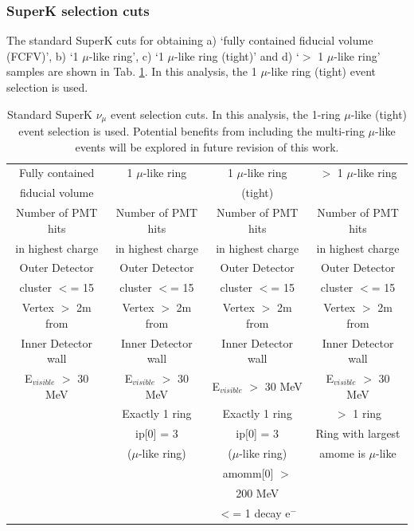 \subsubsection*{SuperK selection cuts}

The standard SuperK cuts for obtaining
a) `fully contained fiducial volume (FCFV)',
b) `1 $\mu$-like ring',
c) `1 $\mu$-like ring (tight)' and
d) `$>$ 1 $\mu$-like ring'
samples are shown in Tab. \ref{tab:NuMuEventSelections}.
In this analysis, the 1 $\mu$-like ring (tight) event selection is used.

\begin{table}
\centering
\begin{tabular}{| c | c | c | c |}
\hline
Fully contained & 1 $\mu$-like ring & 1 $\mu$-like ring & $>$ 1 $\mu$-like ring  \\
fiducial volume &  & (tight) & \\
\hline
\hline
Number of PMT hits  & Number of PMT hits  &  Number of PMT hits  &  Number of PMT hits \\
in highest charge   & in highest charge   &  in highest charge   &  in highest charge  \\
Outer Detector      & Outer Detector      & Outer Detector       & Outer Detector      \\
cluster $<$= 15     & cluster $<$= 15     & cluster $<$= 15      & cluster $<$= 15     \\
\hline
Vertex $>$ 2m from  & Vertex $>$ 2m from  & Vertex $>$ 2m from   & Vertex $>$ 2m from  \\
Inner Detector wall & Inner Detector wall & Inner Detector wall  & Inner Detector wall \\
\hline
E$_{visible}$ $>$ 30 MeV & E$_{visible}$ $>$ 30 MeV & E$_{visible}$ $>$ 30 MeV & E$_{visible}$ $>$ 30 MeV \\
\hline
  & Exactly 1 ring & Exactly 1 ring & $>$ 1 ring \\
\hline
 & ip[0] = 3 & ip[0] = 3 & Ring with largest \\
 & ($\mu$-like ring) & ($\mu$-like ring) & amome is $\mu$-like \\
\hline
 &  & amomm[0] $>$ & \\
 &  & 200 MeV & \\
\hline
 &  & $<$= 1 decay e$^{-}$  & \\
\hline
\end{tabular}
\caption{
 Standard SuperK $\nu_{\mu}$ event selection cuts. In this analysis, the 1-ring $\mu$-like (tight) event selection is used.
 Potential benefits from including the multi-ring $\mu$-like events will be explored in future revision
 of this work.
}
\label{tab:NuMuEventSelections}
\end{table}

